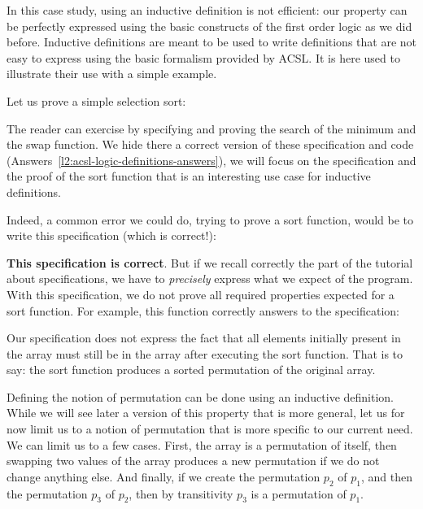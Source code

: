 In this case study, using an inductive definition is not efficient: our
property can be perfectly expressed using the basic constructs of the first
order logic as we did before. Inductive definitions are meant to be used to
write definitions that are not easy to express using the basic formalism
provided by ACSL. It is here used to illustrate their use with a simple
example.



\label{l3:acsl-logic-definitions-inductive-sort}


Let us prove a simple selection sort:




The reader can exercise by specifying and proving the search of the minimum and
the swap function. We hide there a correct version of these specification and
code (Answers~\ref{l2:acsl-logic-definitions-answers}), we will focus on the
specification and the proof of the sort function that is an interesting use case
for inductive definitions.

Indeed, a common error we could do, trying to prove a sort function, would
be to write this specification (which is correct!):




\textbf{This specification is correct}. But if we recall correctly the part of the
tutorial about specifications, we have to \emph{precisely} express what we expect
of the program. With this specification, we do not prove all required properties
expected for a sort function. For example, this function correctly answers to
the specification:




Our specification does not express the fact that all elements initially present
in the array must still be in the array after executing the sort function. That
is to say: the sort function produces a sorted permutation of the original
array.

Defining the notion of permutation can be done using an inductive definition.
While we will see later a version of this property that is more general, let us
for now limit us to a notion of permutation that is more specific to our current
need. We can limit us to a few cases. First, the array is a permutation of
itself, then swapping two values of the array produces a new permutation if we
do not change anything else. And finally, if we create the permutation $p_2$ of
$p_1$, and then the permutation $p_3$ of $p_2$, then by transitivity $p_3$ is a
permutation of $p_1$.

